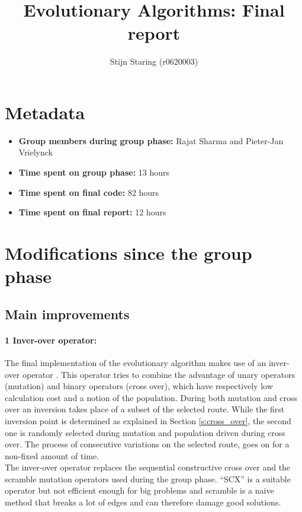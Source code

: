 \documentclass[a4paper,10pt]{article}
\title{Evolutionary Algorithms: Final report}
\author{Stijn Staring (r0620003)}
\newcommand{\RemoveMe}[1]{{\color{purple}#1}}
\begin{document}
\selectfont{}

\maketitle


\section{Metadata}

\begin{itemize}
 \item \textbf{Group members during group phase:} Rajat Sharma and
 Pieter-Jan Vrielynck \\
 \item \textbf{Time spent on group phase:} 13 hours
 \item \textbf{Time spent on final code:} 82 hours
 \item \textbf{Time spent on final report:} 12 hours\\
\end{itemize}

\section{Modifications since the group phase}

\subsection{Main improvements} 

\paragraph{1 Inver-over operator:}\label{p:1}The final implementation of the evolutionary algorithm makes use of an inver-over operator \cite{inver_over}. This operator tries to combine the advantage of unary operators (mutation) and binary operators (cross over), which have respectively low calculation cost and a notion of the population. During both mutation and cross over an inversion takes place of a subset of the selected route. While the first inversion point is determined as explained in  Section \ref{s:cross_over}, the second one is randomly selected during mutation and population driven during cross over. The process of consecutive variations on the selected route, goes on for a non-fixed amount of time.\\
 The inver-over operator replaces the sequential constructive cross over and the scramble mutation operators used during the group phase. ``SCX'' is a suitable operator but not efficient enough for big problems and scramble is a naive method that breaks a lot of edges and can therefore damage good solutions.  
\end{document}
